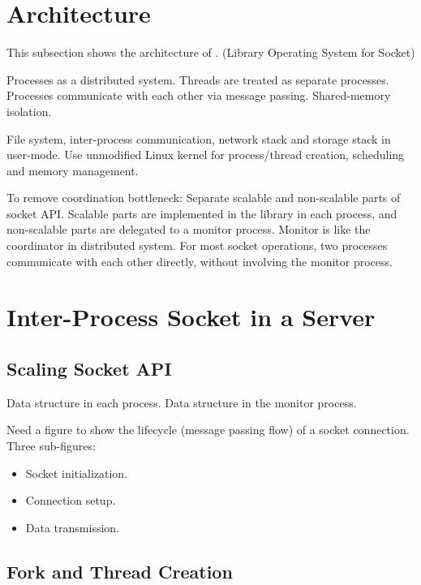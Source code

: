 \section{Architecture}
\label{sec:design}

This subsection shows the architecture of \sys. (Library Operating System for Socket)

Processes as a distributed system.
Threads are treated as separate processes.
Processes communicate with each other via message passing.
Shared-memory isolation.

File system, inter-process communication, network stack and storage stack in user-mode.
Use unmodified Linux kernel for process/thread creation, scheduling and memory management.

To remove coordination bottleneck:
Separate scalable and non-scalable parts of socket API.
Scalable parts are implemented in the library in each process, and non-scalable parts are delegated to a monitor process.
Monitor is like the coordinator in distributed system.
For most socket operations, two processes communicate with each other directly, without involving the monitor process.



\section{Inter-Process Socket in a Server}
\label{sec:intra-server}

\subsection{Scaling Socket API}

Data structure in each process. Data structure in the monitor process.

Need a figure to show the lifecycle (message passing flow) of a socket connection. Three sub-figures:

\begin{itemize}
	\item Socket initialization.
	\item Connection setup.
	\item Data transmission.
\end{itemize}


\subsection{Fork and Thread Creation}

